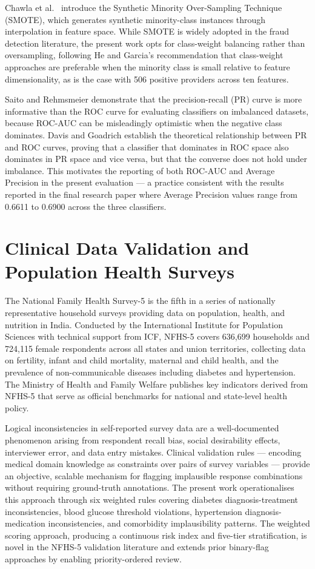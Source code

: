 Chawla et al.\ \cite{b3} introduce the Synthetic Minority Over-Sampling Technique (SMOTE), which generates synthetic minority-class instances through interpolation in feature space. While SMOTE is widely adopted in the fraud detection literature, the present work opts for class-weight balancing rather than oversampling, following He and Garcia's recommendation that class-weight approaches are preferable when the minority class is small relative to feature dimensionality, as is the case with 506 positive providers across ten features.

Saito and Rehmsmeier \cite{b4} demonstrate that the precision-recall (PR) curve is more informative than the ROC curve for evaluating classifiers on imbalanced datasets, because ROC-AUC can be misleadingly optimistic when the negative class dominates. Davis and Goadrich \cite{b5} establish the theoretical relationship between PR and ROC curves, proving that a classifier that dominates in ROC space also dominates in PR space and vice versa, but that the converse does not hold under imbalance. This motivates the reporting of both ROC-AUC and Average Precision in the present evaluation --- a practice consistent with the results reported in the final research paper where Average Precision values range from 0.6611 to 0.6900 across the three classifiers.

\section{Clinical Data Validation and Population Health Surveys}
\label{sec:lit-nfhs}

The National Family Health Survey-5 \cite{b14} is the fifth in a series of nationally representative household surveys providing data on population, health, and nutrition in India. Conducted by the International Institute for Population Sciences with technical support from ICF, NFHS-5 covers 636,699 households and 724,115 female respondents across all states and union territories, collecting data on fertility, infant and child mortality, maternal and child health, and the prevalence of non-communicable diseases including diabetes and hypertension. The Ministry of Health and Family Welfare \cite{b15} publishes key indicators derived from NFHS-5 that serve as official benchmarks for national and state-level health policy.

Logical inconsistencies in self-reported survey data are a well-documented phenomenon arising from respondent recall bias, social desirability effects, interviewer error, and data entry mistakes. Clinical validation rules --- encoding medical domain knowledge as constraints over pairs of survey variables --- provide an objective, scalable mechanism for flagging implausible response combinations without requiring ground-truth annotations. The present work operationalises this approach through six weighted rules covering diabetes diagnosis-treatment inconsistencies, blood glucose threshold violations, hypertension diagnosis-medication inconsistencies, and comorbidity implausibility patterns. The weighted scoring approach, producing a continuous risk index and five-tier stratification, is novel in the NFHS-5 validation literature and extends prior binary-flag approaches by enabling priority-ordered review.

